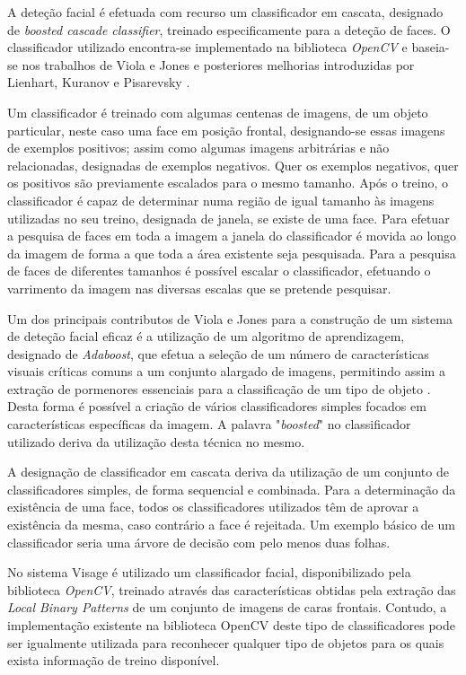 A deteção facial é efetuada com recurso um classificador em cascata, designado de \textit{boosted cascade classifier},  treinado especificamente para a deteção de faces. O classificador utilizado encontra-se implementado na biblioteca \textit{OpenCV} e baseia-se nos trabalhos de Viola e Jones \cite{Viola2001} e posteriores melhorias introduzidas por Lienhart, Kuranov e Pisarevsky \cite{Lienhart2003}.

Um classificador é treinado com algumas centenas de imagens, de um objeto particular, neste caso uma face em posição frontal, designando-se essas imagens de exemplos positivos; assim como algumas imagens arbitrárias e não relacionadas, designadas de exemplos negativos. Quer os exemplos negativos, quer os positivos são previamente escalados para o mesmo tamanho. Após o treino, o classificador é capaz de determinar numa região de igual tamanho às imagens utilizadas no seu treino, designada de janela, se existe de uma face. Para efetuar a pesquisa de faces em toda a imagem a janela do classificador é movida ao longo da imagem de forma a que toda a área existente seja pesquisada. Para a pesquisa de faces de diferentes tamanhos é possível escalar o classificador, efetuando o varrimento da imagem nas diversas escalas que se pretende pesquisar.

Um dos principais contributos de Viola e Jones para a construção de um sistema de deteção facial eficaz é a utilização de um algoritmo de aprendizagem, designado de \textit{Adaboost}, que efetua a seleção de um número de características visuais críticas comuns a um conjunto alargado de imagens, permitindo assim a extração de pormenores essenciais para a classificação de um tipo de objeto \cite{Viola2001}. Desta forma é possível a criação de vários classificadores simples focados em características específicas da imagem. A palavra "\textit{boosted}" no classificador utilizado deriva da utilização desta técnica no mesmo.
 
A designação de classificador em cascata deriva da utilização de um conjunto de classificadores simples, de forma sequencial e combinada. Para a determinação da existência de uma face, todos os classificadores utilizados  têm de aprovar a existência da mesma, caso contrário a face é rejeitada. Um exemplo básico de um classificador seria uma árvore de decisão com pelo menos duas folhas.

No sistema Visage é utilizado um classificador facial, disponibilizado pela biblioteca \textit{OpenCV}, treinado através das características obtidas pela extração das \textit{Local Binary Patterns} \cite{Ahonen2006} de um conjunto de imagens de caras frontais. Contudo, a implementação existente na biblioteca OpenCV deste tipo de classificadores pode ser igualmente utilizada para reconhecer qualquer tipo de objetos para os quais exista informação de treino disponível.

